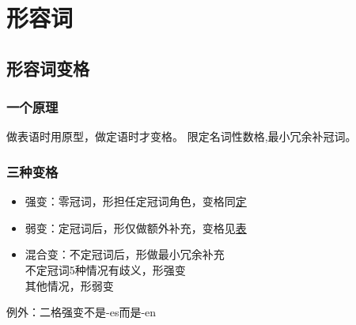 \chapter{形容词}
\section{形容词变格}

\subsection{一个原理}
\begin{center}
    \begin{myquote}
        做表语时用原型，做定语时才变格。
        限定名词性数格,最小冗余补冠词。
    \end{myquote}
\end{center}

\subsection{三种变格}
\begin{itemize}
    \item 强变：零冠词，形担任定冠词角色，变格同\hyperref[sec:pron:strong_adj]{定} \\
    \item 弱变：定冠词后，形仅做额外补充，变格见\hyperref[sec:pron:seak_adj]{表} \\
    \item 混合变：不定冠词后，形做最小冗余补充 \\
          不定冠词5种情况有歧义，形强变\\
          其他情况，形弱变
\end{itemize}
例外：二格强变不是-es而是-en

